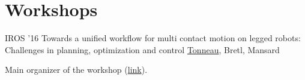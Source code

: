 \documentclass{tccv}
\begin{document}








\section{Workshops}
\begin{eventlist}
\item{IROS '16}
{Towards a unified workflow for multi contact motion on legged robots:
Challenges in planning, optimization and control}
{\underline{Tonneau}, Bretl, Mansard}

Main organizer of the workshop (\href{http://homepages.laas.fr/nmansard/entracte/index.php?n=Publication.WorkshopIROS2016}{link}).
\end{eventlist}
\end{document}
